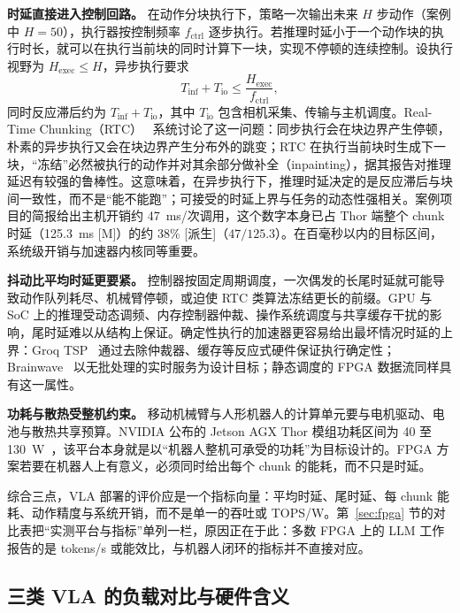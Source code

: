 \documentclass[a4paper,10.5pt]{ctexart}
\newcommand{\tM}{\textsf{[M]}}              %
\newcommand{\tD}{\textsf{[派生]}}           %
\begin{document}
\textbf{时延直接进入控制回路。} 在动作分块执行下，策略一次输出未来 $H$ 步动作（案例中 $H=50$），执行器按控制频率 $f_{\text{ctrl}}$ 逐步执行。若推理时延小于一个动作块的执行时长，就可以在执行当前块的同时计算下一块，实现不停顿的连续控制。设执行视野为 $H_{\text{exec}}\le H$，异步执行要求
\begin{equation}
  T_{\text{inf}} + T_{\text{io}} \le \frac{H_{\text{exec}}}{f_{\text{ctrl}}},
  \label{eq:async}
\end{equation}
同时反应滞后约为 $T_{\text{inf}}+T_{\text{io}}$，其中 $T_{\text{io}}$ 包含相机采集、传输与主机调度。Real-Time Chunking（RTC）~\cite{rtc} 系统讨论了这一问题：同步执行会在块边界产生停顿，朴素的异步执行又会在块边界产生分布外的跳变；RTC 在执行当前块时生成下一块，“冻结”必然被执行的动作并对其余部分做补全（inpainting），据其报告对推理延迟有较强的鲁棒性。这意味着，在异步执行下，推理时延决定的是反应滞后与块间一致性，而不是“能不能跑”；可接受的时延上界与任务的动态性强相关。案例项目的简报给出主机开销约 47~ms/次调用，这个数字本身已占 Thor 端整个 chunk 时延（125.3~ms \tM）的约 38\% \tD（$47/125.3$）。在百毫秒以内的目标区间，系统级开销与加速器内核同等重要。

\textbf{抖动比平均时延更要紧。} 控制器按固定周期调度，一次偶发的长尾时延就可能导致动作队列耗尽、机械臂停顿，或迫使 RTC 类算法冻结更长的前缀。GPU 与 SoC 上的推理受动态调频、内存控制器仲裁、操作系统调度与共享缓存干扰的影响，尾时延难以从结构上保证。确定性执行的加速器更容易给出最坏情况时延的上界：Groq TSP~\cite{groq} 通过去除仲裁器、缓存等反应式硬件保证执行确定性；Brainwave~\cite{brainwave} 以无批处理的实时服务为设计目标；静态调度的 FPGA 数据流同样具有这一属性。

\textbf{功耗与散热受整机约束。} 移动机械臂与人形机器人的计算单元要与电机驱动、电池与散热共享预算。NVIDIA 公布的 Jetson AGX Thor 模组功耗区间为 40 至 130~W~\cite{thor}，该平台本身就是以“机器人整机可承受的功耗”为目标设计的。FPGA 方案若要在机器人上有意义，必须同时给出每个 chunk 的能耗，而不只是时延。

综合三点，VLA 部署的评价应是一个指标向量：平均时延、尾时延、每 chunk 能耗、动作精度与系统开销，而不是单一的吞吐或 TOPS/W。第~\ref{sec:fpga} 节的对比表把“实测平台与指标”单列一栏，原因正在于此：多数 FPGA 上的 LLM 工作报告的是 tokens/s 或能效比，与机器人闭环的指标并不直接对应。


\subsection{三类 VLA 的负载对比与硬件含义}\label{sec:vlacompare}
\end{document}

